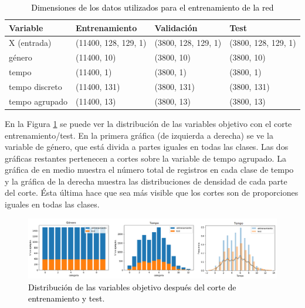 \begin{table}[ht]
\centering
\begin{tabular}{llll}
\hline
\textbf{Variable} & \textbf{Entrenamiento} & \textbf{Validación} & \textbf{Test} \\ \hline
X (entrada) 		&	(11400, 128, 129, 1)				& 	(3800, 128, 129, 1)		& (3800, 128, 129, 1)  \\ 
género		&	(11400, 10)	&	(3800, 10)	  & (3800, 10)  \\ 
tempo		&	(11400, 1)	&	(3800, 1)	  & (3800, 1)   \\ 
tempo discreto		&	(11400, 131)	&	(3800, 131)	  & (3800, 131) \\ 
tempo agrupado		&	(11400, 13)	&	(3800, 13)	  & (3800, 13) \\ \hline
\end{tabular}
\caption{\textcolor{black}{Dimensiones de los datos utilizados para el entrenamiento de la red}}
\label{tab:variable_dim}
\end{table}

En la Figura \ref{Fig:distribucion_y} se puede ver la distribución de las variables objetivo con el corte entrenamiento/test. En la primera gráfica (de izquierda a derecha) se ve la variable de género, que está divida a partes iguales en todas las clases. Las dos gráficas restantes pertenecen a cortes sobre la variable de tempo agrupado. La gráfica de en medio muestra el número total de registros en cada clase de tempo y la gráfica de la derecha muestra las distribuciones de densidad de cada parte del corte. Ésta última hace que sea más visible que los cortes son de proporciones iguales en todas las clases.

\begin{figure}[htb]
  \centering
  \includegraphics[width=\textwidth]{Figures/distribucion_y.png}
  \caption{\textcolor{black}{Distribución de las variables objetivo después del corte de entrenamiento y test}.}
  \label{Fig:distribucion_y}
\end{figure}



